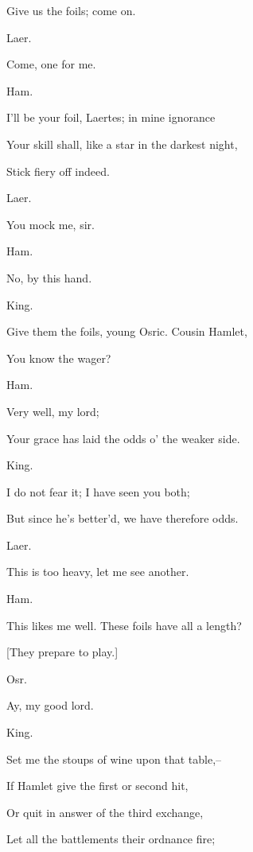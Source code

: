 \documentclass[12pt]{book}
\begin{document}
Give us the foils; come on.



Laer.

Come, one for me.



Ham.

I'll be your foil, Laertes; in mine ignorance

Your skill shall, like a star in the darkest night,

Stick fiery off indeed.



Laer.

You mock me, sir.



Ham.

No, by this hand.



King.

Give them the foils, young Osric. Cousin Hamlet,

You know the wager?



Ham.

Very well, my lord;

Your grace has laid the odds o' the weaker side.



King.

I do not fear it; I have seen you both;

But since he's better'd, we have therefore odds.



Laer.

This is too heavy, let me see another.



Ham.

This likes me well. These foils have all a length?



[They prepare to play.]



Osr.

Ay, my good lord.



King.

Set me the stoups of wine upon that table,--

If Hamlet give the first or second hit,

Or quit in answer of the third exchange,

Let all the battlements their ordnance fire;
\end{document}
